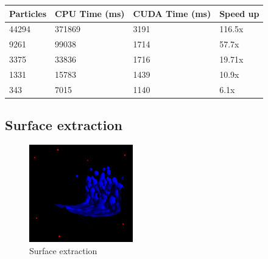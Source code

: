 \documentclass[acmtog]{acmart}
\begin{document}
\begin{table}[h]
	\begin{tabular}{l|l|l|l}
		Particles & CPU Time (ms) & CUDA Time (ms) & Speed up \\ \hline
		44294     & 371869        & 3191           & 116.5x   \\ \hline
		9261      & 99038         & 1714           & 57.7x    \\ \hline
		3375      & 33836         & 1716           & 19.71x   \\ \hline
		1331      & 15783         & 1439           & 10.9x    \\ \hline
		343       & 7015          & 1140           & 6.1x     \\
	\end{tabular}
\end{table}

\subsection{Surface extraction}


\begin{figure}[h]
	\centering
	\includegraphics[width=0.40\textwidth]{surface-extraction.png}
	\caption{Surface extraction}
	\label{fig:particle}
\end{figure}
\end{document}
